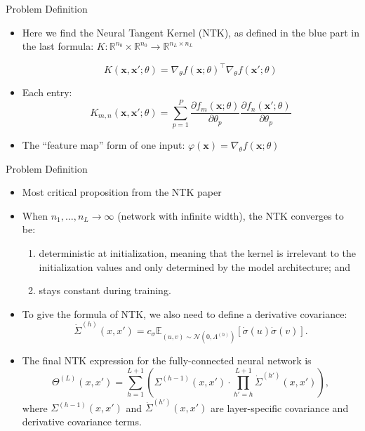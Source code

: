 \documentclass[serif, aspectratio=169]{beamer}
\begin{document}
\begin{frame}{Problem Definition}
	
	\begin{itemize}
		\item Here we find the Neural Tangent Kernel (NTK), as defined in the blue part in the last formula: \(K: \mathbb{R}^{n_0}\times\mathbb{R}^{n_0} \to \mathbb{R}^{n_L \times n_L}\)
		
		\[
		K(\mathbf{x}, \mathbf{x}'; \theta) = \nabla_\theta f(\mathbf{x};\theta)^\top \nabla_\theta f(\mathbf{x}'; \theta)
		\]
		\item Each entry:
		\[
		K_{m,n}(\mathbf{x}, \mathbf{x}'; \theta) = \sum_{p=1}^P \frac{\partial f_m(\mathbf{x};\theta)}{\partial \theta_p} \frac{\partial f_n(\mathbf{x}';\theta)}{\partial \theta_p}
		\]
		\item The “feature map” form of one input: \(\varphi(\mathbf{x}) = \nabla_\theta f(\mathbf{x};\theta)\)
	\end{itemize}
\end{frame}



\begin{frame}{Problem Definition}
	
	\begin{itemize}
		\item Most critical proposition from the NTK paper
		\item When \(n_1, \dots, n_L \to \infty\) (network with infinite width), the NTK converges to be:
		\begin{enumerate}
				\item deterministic at initialization, meaning that the kernel is irrelevant to the initialization values and only determined by the model architecture; and
			\item stays constant during training.
		\end{enumerate}
	
		
	\end{itemize}
\end{frame}

\begin{frame}

 \begin{itemize}
 	
 \item To give the formula of NTK, we also need to define a derivative covariance:
 \[
 \dot{\Sigma}^{(h)}(x, x') = c_\sigma \mathbb{E}_{(u, v) \sim \mathcal{N}(0, \Lambda^{(h)})} \left[ \dot{\sigma}(u) \dot{\sigma}(v) \right].
 \]
 
 \item The final NTK expression for the fully-connected neural network is
 \[
 \Theta^{(L)}(x, x') = \sum_{h=1}^{L+1} \left( \Sigma^{(h-1)}(x, x') \cdot \prod_{h'=h}^{L+1} \dot{\Sigma}^{(h')}(x, x') \right),
 \]
 where \( \Sigma^{(h-1)}(x, x') \) and \( \dot{\Sigma}^{(h')}(x, x') \) are layer-specific covariance and derivative covariance terms.
 
 \end{itemize}
\end{frame}
 
\end{document}
